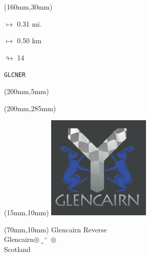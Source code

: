 \begin{textblock*}{40mm}(160mm,30mm)%
\Large
\par$\mapsto$ 0.31 mi.
\par$\mapsto$ 0.50 km
\par$\looparrowright$ 14
\par\hfill\tiny\tt GLCNER\\
\end{textblock*}
\begin{textblock*}{20mm}(200mm,5mm)%
\fbox{\thepage}
\label{GLCNER}
\end{textblock*}
\begin{textblock*}{20mm}(200mm,285mm)%
\fbox{\thepage}
\end{textblock*}

\null\newpage
\begin{textblock*}{50mm}(15mm,10mm)%
\includegraphics[width=50mm]{LG/GLCN.png}
\end{textblock*}
\begin{textblock*}{130mm}(70mm,10mm)%
{\fontsize{20}{20}\selectfont Glencairn Reverse\\}
{\fontsize{16}{16}\selectfont Glencairn\hfill $\circledcirc\llcorner^{\rightthreetimes}\circledcirc$\\}
{\fontsize{12}{12}\selectfont Scotland\\}
\end{textblock*}
